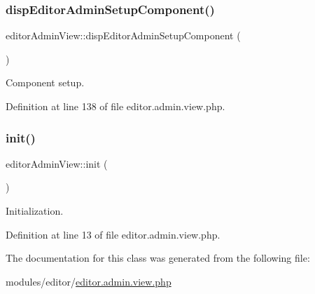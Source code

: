 \subsubsection{\texorpdfstring{disp\+Editor\+Admin\+Setup\+Component()}{dispEditorAdminSetupComponent()}}
{\footnotesize\ttfamily editor\+Admin\+View\+::disp\+Editor\+Admin\+Setup\+Component (\begin{DoxyParamCaption}{ }\end{DoxyParamCaption})}



Component setup. 



Definition at line 138 of file editor.\+admin.\+view.\+php.

\hypertarget{classeditorAdminView_a18af5d75c5a6fda358ddd301f99ef609}{}\label{classeditorAdminView_a18af5d75c5a6fda358ddd301f99ef609} 
\subsubsection{\texorpdfstring{init()}{init()}}
{\footnotesize\ttfamily editor\+Admin\+View\+::init (\begin{DoxyParamCaption}{ }\end{DoxyParamCaption})}



Initialization. 



Definition at line 13 of file editor.\+admin.\+view.\+php.



The documentation for this class was generated from the following file\+:\begin{DoxyCompactItemize}
\item 
modules/editor/\hyperlink{editor_8admin_8view_8php}{editor.\+admin.\+view.\+php}\end{DoxyCompactItemize}
